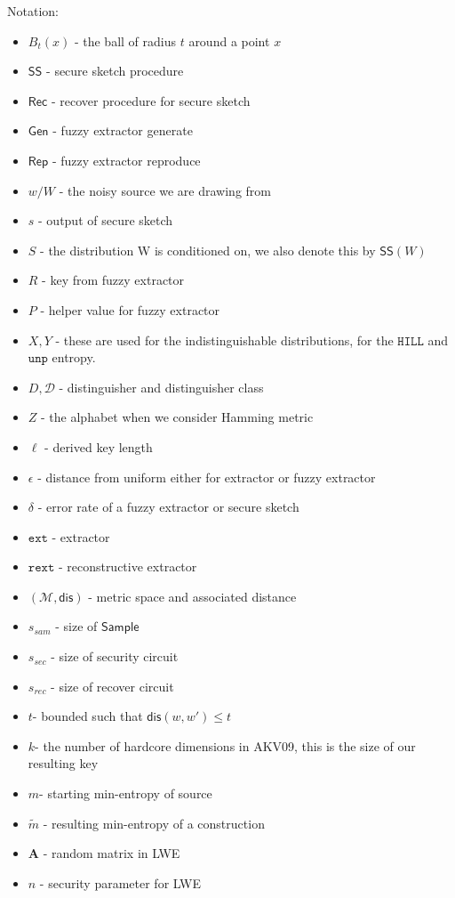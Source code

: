 \documentclass[11pt]{article}
\newcommand{\class}[1]{{\ensuremath{\mathsf{#1}}}}
\newcommand{\gen}{\ensuremath{\class{Gen}}\xspace}
\newcommand{\rep}{\ensuremath{\class{Rep}}\xspace}
\newcommand{\sketch}{\ensuremath{\class{SS}}\xspace}
\newcommand{\rec}{\ensuremath{\class{Rec}}\xspace}
\newcommand{\vect}[1]{\ensuremath{\textbf{#1}}}
\newcommand{\sample}{\ensuremath{\class{Sample}}\xspace}
\newcommand{\dis}{\ensuremath{\mathsf{dis}}}
\newcommand{\hill}{\ensuremath{\mathtt{HILL}}\xspace}
\newcommand{\unp}{\ensuremath{\mathtt{unp}}\xspace}
\newcommand{\ext}{\ensuremath{\mathtt{ext}}}
\newcommand{\rext}{\ensuremath{\mathtt{rext}}}
\begin{document}
Notation:
\begin{itemize}
\item $B_t(x)$ - the ball of radius $t$ around a point $x$
\item $\sketch$ - secure sketch procedure
\item $\rec$ - recover procedure for secure sketch
\item $\gen$ - fuzzy extractor generate
\item $\rep$ - fuzzy extractor reproduce
\item $w/W$ - the noisy source we are drawing from
\item $s$ - output of secure sketch
\item $S$ - the distribution W is conditioned on, we also denote this by $\sketch(W)$
\item $R$ - key from fuzzy extractor
\item $P$ - helper value for fuzzy extractor
\item $X, Y$ - these are used for the indistinguishable distributions, for the $\hill$ and $\unp$ entropy.
\item $D, \mathcal{D}$ - distinguisher and distinguisher class
\item $Z$ - the alphabet when we consider Hamming metric
\item $\ell$ - derived key length
\item $\epsilon$ - distance from uniform either for extractor or fuzzy extractor
\item $\delta$ - error rate of a fuzzy extractor or secure sketch
\item $\ext$ - extractor
\item $\rext$ - reconstructive extractor
\item $(\mathcal{M}, \dis)$ - metric space and associated distance
\item $s_{sam}$ - size of $\sample$
\item $s_{sec}$ - size of security circuit
\item $s_{rec}$ - size of recover circuit
\item $t$- bounded such that $\dis(w, w')\leq t$
\item $k$- the number of hardcore dimensions in AKV09, this is the size of our resulting key
\item $m$- starting min-entropy of source
\item $\tilde{m}$ - resulting min-entropy of a construction
\item $\vect{A}$ - random matrix in LWE
\item $n$ - security parameter for LWE

\end{itemize}
\end{document}
